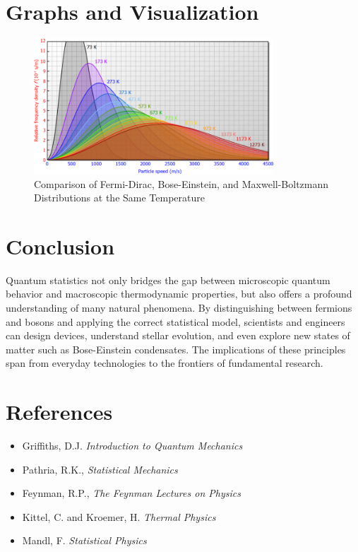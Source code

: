 \documentclass[12pt,a4paper]{article}
\begin{document}
\section{Graphs and Visualization}
\begin{figure}[H]
    \centering
    \includegraphics[width=0.8\textwidth]{distribution_curves.png}
    \caption{Comparison of Fermi-Dirac, Bose-Einstein, and Maxwell-Boltzmann Distributions at the Same Temperature}
\end{figure}

\section{Conclusion}
Quantum statistics not only bridges the gap between microscopic quantum behavior and macroscopic thermodynamic properties, but also offers a profound understanding of many natural phenomena. By distinguishing between fermions and bosons and applying the correct statistical model, scientists and engineers can design devices, understand stellar evolution, and even explore new states of matter such as Bose-Einstein condensates. The implications of these principles span from everyday technologies to the frontiers of fundamental research.

\section{References}
\begin{itemize}
    \item Griffiths, D.J. \textit{Introduction to Quantum Mechanics}
    \item Pathria, R.K., \textit{Statistical Mechanics}
    \item Feynman, R.P., \textit{The Feynman Lectures on Physics}
    \item Kittel, C. and Kroemer, H. \textit{Thermal Physics}
    \item Mandl, F. \textit{Statistical Physics}
\end{itemize}
\end{document}
